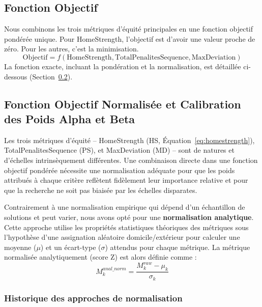 \documentclass[11pt, a4paper]{article}
\begin{document}
\subsection{Fonction Objectif}
\label{subsec:fonction_objectif_initiale}
Nous combinons les trois métriques d'équité principales en une fonction objectif pondérée unique. Pour HomeStrength, l'objectif est d'avoir une valeur proche de zéro. Pour les autres, c'est la minimisation.
\begin{equation}
    \text{Objectif} = f(\text{HomeStrength}, \text{TotalPenalitesSequence}, \text{MaxDeviation})
\end{equation}
La fonction exacte, incluant la pondération et la normalisation, est détaillée ci-dessous (Section~\ref{sec:normalisation_et_objectif_sa}).

\subsection[Fonction Objectif Normalisée et Calibration des Poids Alpha et Beta]{Fonction Objectif Normalisée et Calibration des Poids Alpha et Beta}
\label{sec:normalisation_et_objectif_sa}
Les trois métriques d'équité -- HomeStrength (HS, Équation~\ref{eq:homestrength}), TotalPenalitesSequence (PS), et MaxDeviation (MD) -- sont de natures et d'échelles intrinsèquement différentes. Une combinaison directe dans une fonction objectif pondérée nécessite une normalisation adéquate pour que les poids attribués à chaque critère reflètent fidèlement leur importance relative et pour que la recherche ne soit pas biaisée par les échelles disparates.

Contrairement à une normalisation empirique qui dépend d'un échantillon de solutions et peut varier, nous avons opté pour une \textbf{normalisation analytique}. Cette approche utilise les propriétés statistiques théoriques des métriques sous l'hypothèse d'une assignation aléatoire domicile/extérieur pour calculer une moyenne ($\mu$) et un écart-type ($\sigma$) attendus pour chaque métrique. La métrique normalisée analytiquement (score Z) est alors définie comme :
\begin{equation}
    M_k^{anal\_norm} = \frac{M_k^{raw} - \mu_k}{\sigma_k}
    \label{eq:anal_norm_general}
\end{equation}


\subsubsection{Historique des approches de normalisation}
\end{document}
